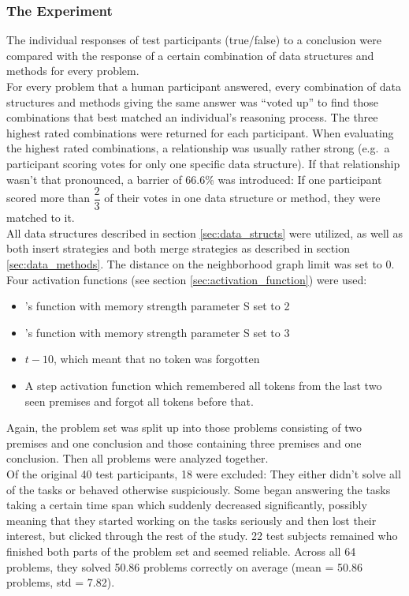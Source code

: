 \documentclass[hidelinks]{scrartcl}
\begin{document}
\subsubsection{The Experiment}
The individual responses of test participants (true/false) to a conclusion were compared with the response of a certain combination of data structures and methods for every problem. \\
For every problem that a human participant answered, every combination of data structures and methods giving the same answer was ``voted up'' to find those combinations that best matched an individual's reasoning process. The three highest rated combinations were returned for each participant. When evaluating the highest rated combinations, a relationship was usually rather strong (e.g.\ a participant scoring votes for only one specific data structure). If that relationship wasn't that pronounced, a barrier of 66.6\% was introduced: If one participant scored more than $\dfrac{2}{3}$ of their votes in one data structure or method, they were matched to it. \\
All data structures described in section \ref{sec:data_structs} were utilized, as well as both insert strategies and both merge strategies as described in section \ref{sec:data_methods}. The distance on the neighborhood graph limit was set to 0. Four activation functions (see section \ref{sec:activation_function}) were used:
\begin{itemize}
	\item \cite{Yffelti.2016}'s function with memory strength parameter S set to 2
	\item \cite{Yffelti.2016}'s function with memory strength parameter S set to 3
	\item $t - 10$, which meant that no token was forgotten
	\item A step activation function which remembered all tokens from the last two seen premises and forgot all tokens before that.
\end{itemize}
Again, the problem set was split up into those problems consisting of two premises and one conclusion and those containing three premises and one conclusion. Then all problems were analyzed together. \\
Of the original 40 test participants, 18 were excluded: They either didn't solve all of the tasks or behaved otherwise suspiciously. Some began answering the tasks taking a certain time span which suddenly decreased significantly, possibly meaning that they started working on the tasks seriously and then lost their interest, but clicked through the rest of the study. 22 test subjects remained who finished both parts of the problem set and seemed reliable. Across all 64 problems, they solved 50.86 problems correctly on average (mean = 50.86 problems, std = 7.82).
\end{document}
